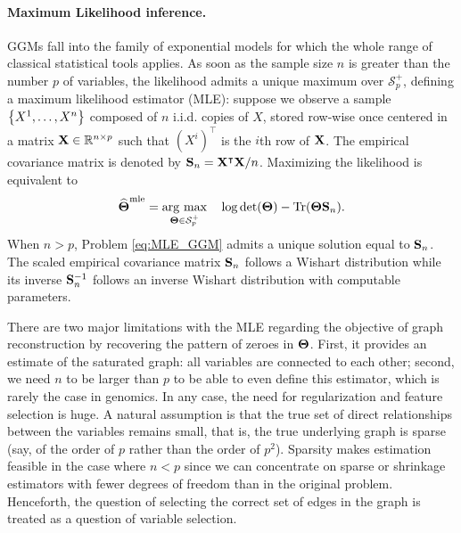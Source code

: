 \paragraph*{Maximum Likelihood inference.}  GGMs  fall into the family
of  exponential  models  for  which   the  whole  range  of  classical
statistical tools applies.  As soon as  the sample size $n$ is greater
than  the number  $p$ of  variables,  the likelihood  admits a  unique
maximum  over  $\mathcal{S}_{p}^+$,   defining  a  maximum  likelihood
estimator  (MLE): suppose  we observe  a sample  $\left\{X^1,\dots,X^n\right\}$
composed of $n$  i.i.d.  copies of $X$, stored  row-wise once centered
in a matrix $\mathbf{X} \in \mathbb{R}^{n\times  p}$ such that $(X^i)^\top$ is the
$i$th row  of $\mathbf{X}$.   The empirical covariance  matrix is  denoted by
$\mathbf{S}_n   =  \mathbf{X}^\intercal   \mathbf{X}/n$.   Maximizing   the
likelihood is equivalent to
\begin{equation}
\label{eq:MLE_GGM}
\widehat{\boldsymbol\Theta}^{\text{mle}} = \mathop{\mathrm{arg\ max}}_{\boldsymbol\Theta  \in \mathcal{S}_p^+}\quad
\log \det(\boldsymbol\Theta) - \mathrm{Tr}(\boldsymbol\Theta \mathbf{S}_n).
\end{equation}
When $n>p$, Problem \eqref{eq:MLE_GGM}  admits a unique solution equal
to  $\mathbf{S}_n$.   The  scaled  empirical  covariance  matrix  $\mathbf{S}_n$
follows  a  Wishart  distribution  while  its  inverse  $\mathbf{S}_n^{-1}$
follows an inverse Wishart distribution with computable parameters.

There are two  major limitations with the MLE  regarding the objective
of  graph  reconstruction  by  recovering the  pattern  of  zeroes  in
$\boldsymbol\Theta$. First, it provides an  estimate of the saturated graph: all
variables  are connected  to each  other; second,  we need  $n$ to  be
larger than  $p$ to be  able to even  define this estimator,  which is
rarely the case in genomics. In  any case, the need for regularization
and feature selection is huge.  A  natural assumption is that the true
set of direct relationships between  the variables remains small, that
is, the  true underlying  graph is  sparse (say, of  the order  of $p$
rather than the  order of $p^2$).  Sparsity  makes estimation feasible
in  the  case where  $n<p$  since  we  can  concentrate on  sparse  or
shrinkage  estimators  with  fewer  degrees of  freedom  than  in  the
original problem.   Henceforth, the question of  selecting the correct
set  of edges  in  the graph  is  treated as  a  question of  variable
selection.

